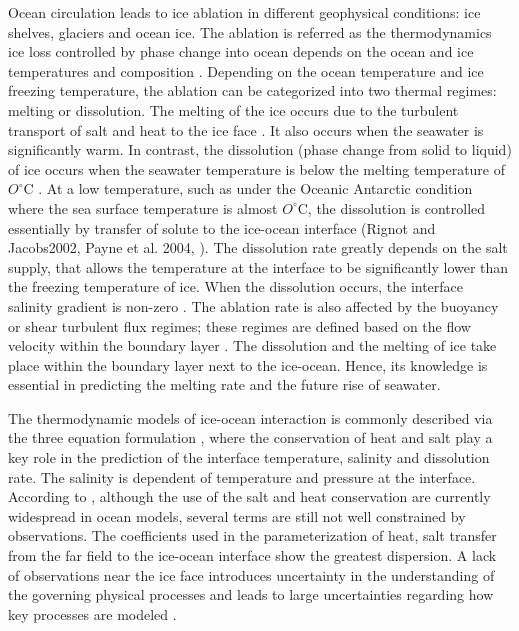 \documentclass[11pt,a4paper]{article}
\begin{document}
	Ocean circulation leads to ice ablation in different geophysical conditions: ice shelves, glaciers and ocean ice. The ablation is referred as the thermodynamics ice loss controlled by phase change into ocean depends on the ocean and ice temperatures and composition \citep{malyarenko2020synthesis}. Depending on the ocean temperature and ice freezing temperature, the ablation can be categorized into two thermal regimes: melting or dissolution. The melting of the ice occurs due to the turbulent transport of salt and heat to the ice face \citep{gayen2016simulation}. It also occurs when the seawater is significantly warm. In contrast, the dissolution (phase change from solid to liquid) of ice occurs when the seawater temperature is below the melting temperature of $O^{\circ}$C \citep{mcphee1987dynamics, nicholls2012ocean, malyarenko2020synthesis}. At a low temperature, such as under the Oceanic Antarctic condition where the sea surface temperature is almost $O^{\circ}$C, the dissolution is controlled essentially by transfer of solute to the ice-ocean interface (Rignot and Jacobs2002, Payne et al. 2004, \cite{gayen2016simulation}). The dissolution rate greatly depends on the salt supply, that allows the temperature at the interface to be significantly lower than the freezing temperature of ice. When the dissolution occurs, the interface salinity gradient is non-zero \citep{kerr2015dissolution}. The ablation rate is also affected by the buoyancy or shear turbulent flux regimes; these regimes are defined based on the flow velocity within the boundary layer \citep{wells2008geophysical}. The dissolution and the melting of ice take place within the boundary layer next to the ice-ocean. Hence, its knowledge is essential in predicting the melting rate and the future rise of seawater.
	
	The thermodynamic models of ice-ocean interaction is commonly described via the three equation formulation \citep{holland1999modeling}, where the conservation of heat and salt play a key role in the prediction of the interface temperature, salinity and dissolution rate. The salinity is dependent of temperature and pressure at the interface. According to \cite{malyarenko2020synthesis}, although the use of the salt and heat conservation are currently widespread in ocean models, several terms are still not well constrained by observations. The coefficients used in the parameterization of heat, salt transfer from the far field to the ice-ocean interface show the greatest dispersion. A lack of observations near the ice face introduces uncertainty in the understanding of the governing physical processes and leads to large uncertainties regarding how key processes are modeled \citep{malyarenko2020synthesis}.
	
\end{document}
